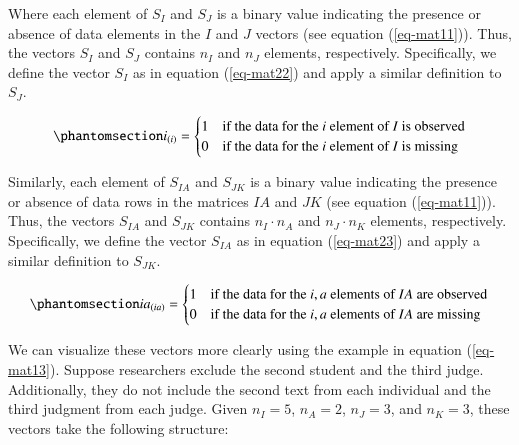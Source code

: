 \documentclass[
  authoryear,
  review,
  1p]{elsarticle}
\begin{document}
Where each element of \(S_{I}\) and \(S_{J}\) is a binary value
indicating the presence or absence of data elements in the \(I\) and
\(J\) vectors (see equation (\ref{eq-mat11})). Thus, the vectors
\(S_{I}\) and \(S_{J}\) contains \(n_{I}\) and \(n_{J}\) elements,
respectively. Specifically, we define the vector \(S_{I}\) as in
equation (\ref{eq-mat22}) and apply a similar definition to \(S_{J}\).

\begin{equation}\phantomsection\label{eq-mat22}{
i_{(i)} = \begin{cases} 
1 & \text{if the data for the } i \text{ element of } I \text{ is observed} \\
0 & \text{if the data for the } i \text{ element of } I \text{ is missing}
\end{cases}
}\end{equation}

Similarly, each element of \(S_{IA}\) and \(S_{JK}\) is a binary value
indicating the presence or absence of data rows in the matrices \(IA\)
and \(JK\) (see equation (\ref{eq-mat11})). Thus, the vectors \(S_{IA}\)
and \(S_{JK}\) contains \(n_{I} \cdot n_{A}\) and \(n_{J} \cdot n_{K}\)
elements, respectively. Specifically, we define the vector \(S_{IA}\) as
in equation (\ref{eq-mat23}) and apply a similar definition to
\(S_{JK}\).

\begin{equation}\phantomsection\label{eq-mat23}{
ia_{(ia)} = \begin{cases} 
1 & \text{if the data for the } i,a \text{ elements of } IA \text{ are observed} \\
0 & \text{if the data for the } i,a \text{ elements of } IA \text{ are missing}
\end{cases}
}\end{equation}

We can visualize these vectors more clearly using the example in
equation (\ref{eq-mat13}). Suppose researchers exclude the second
student and the third judge. Additionally, they do not include the
second text from each individual and the third judgment from each judge.
Given \(n_{I} = 5\), \(n_{A} = 2\), \(n_{J} = 3\), and \(n_{K} = 3\),
these vectors take the following structure:
\end{document}
